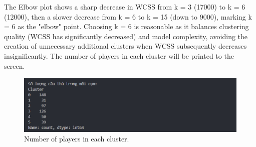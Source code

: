 \documentclass[12pt, a4paper]{report}
\begin{document}
The Elbow plot shows a sharp decrease in WCSS from k = 3 (17000) to k = 6 (12000), then a slower decrease from k = 6 to k = 15 (down to 9000), marking k = 6 as the "elbow" point.
Choosing k = 6 is reasonable as it balances clustering quality (WCSS has significantly decreased) and model complexity, avoiding the creation of unnecessary additional clusters when WCSS subsequently decreases insignificantly.
The number of players in each cluster will be printed to the screen.

\begin{figure}[H]
    \centering
    \includegraphics[width=\textwidth]{cluster.png}
    \caption{Number of players in each cluster.}
    \label{fig:players_per_cluster}
\end{figure}
\end{document}

